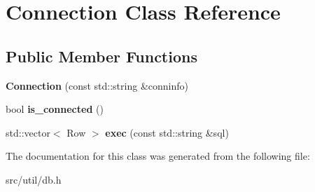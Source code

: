 \hypertarget{class_connection}{}\section{Connection Class Reference}
\label{class_connection}
\subsection*{Public Member Functions}
\begin{DoxyCompactItemize}
\item 
\mbox{\label{class_connection_a001e4ac07b5d15f9f3c33e1684765c18}} 
{\bfseries Connection} (const std\+::string \&conninfo)
\item 
\mbox{\label{class_connection_a7539a59b23a618070a1deaa1ec1362df}} 
bool {\bfseries is\+\_\+connected} ()
\item 
\mbox{\label{class_connection_af09c0078822c549da757873444f5c745}} 
std\+::vector$<$ Row $>$ {\bfseries exec} (const std\+::string \&sql)
\end{DoxyCompactItemize}


The documentation for this class was generated from the following file\+:\begin{DoxyCompactItemize}
\item 
src/util/db.\+h\end{DoxyCompactItemize}
